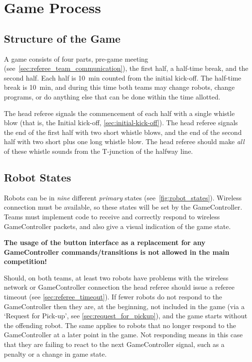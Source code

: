 \section{Game Process}
\label{sec:game_process}

\subsection{Structure of the Game}
\label{sec:game_struct}

A game consists of four parts, pre-game meeting (see~\cref{sec:referee_team_communication}), the first half, a half-time break, and the second half.
Each half is \qty{10}{\minute} counted from the initial kick-off.
The half-time break is \qty{10}{\minute}, and during this time both teams may change robots, change programs, or do anything else that can be done within the time allotted.

The head referee signals the commencement of each half with a single whistle blow (that is, the Initial kick-off, \cf \cref{sec:initial-kick-off}).
The head referee signals the end of the first half with two short whistle blows, and the end of the second half with two short plus one long whistle blow.
The head referee should make \textit{all} of these whistle sounds from the T-junction of the halfway line.

\subsection{Robot States}
\label{sec:robot_states}

Robots can be in \textit{nine} different \emph{primary} states (see~\cref{fig:robot_states}).
Wireless connection must be available, so these states will be set by the GameController.
Teams must implement code to receive and correctly respond to wireless GameController packets, and also give a visual indication of the game state.

\textbf{The usage of the button interface as a replacement for any GameController commands/transitions is not allowed in the main competition!}

Should, on both teams, at least two robots have problems with the wireless network or GameController connection the head referee should issue a referee timeout (see \cref{sec:referee_timeout}).
If fewer robots do not respond to the GameController then they are, at the beginning, not included in the game (via a `Request for Pick-up', see \cref{sec:request_for_pickup}), and the game starts without the offending robot. The same applies to robots that no longer respond to the GameController at a later point in the game. Not responding means in this case that they are failing to react to the next GameController signal, such as a penalty or a change in game state.

